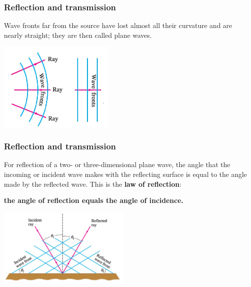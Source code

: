 \documentclass[]{beamer}
\begin{document}


\begin{frame}
\frametitle{Reflection and transmission }




Wave fronts far from the source have lost almost all their
curvature  and are nearly straight; they are
then called plane waves.


  \begin{center}
  \includegraphics[height=1.7in]{images4/13.jpg}
\end{center}

  \end{frame}






\begin{frame}
\frametitle{Reflection and transmission }




For reflection of a two- or three-dimensional plane wave,
the angle that the incoming or incident wave makes with the reflecting surface is
equal to the angle made by the reflected wave. This is the\textbf{ law of reflection}:

\vspace{3mm}

\textbf{the angle of reflection equals the angle of incidence.}


  \begin{center}
  \includegraphics[height=1.5in]{images4/14.jpg}
\end{center}

  \end{frame}
\end{document}
